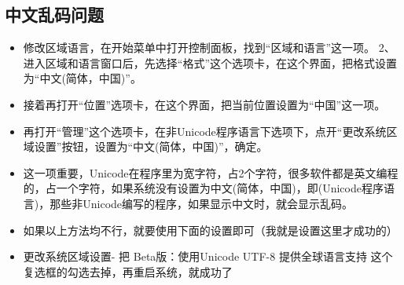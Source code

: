 \subsection{中文乱码问题}
\begin{itemize}
\item 修改区域语言，在开始菜单中打开控制面板，找到“区域和语言”这一项。
2、进入区域和语言窗口后，先选择“格式”这个选项卡，在这个界面，把格式设置为“中文(简体，中国)”。
\item 接着再打开“位置”选项卡，在这个界面，把当前位置设置为“中国”这一项。
\item 再打开“管理”这个选项卡，在非Unicode程序语言下选项下，点开“更改系统区域设置”按钮，设置为“中文(简体，中国)”，确定。
\item 这一项重要，Unicode在程序里为宽字符，占2个字符，很多软件都是英文编程的，占一个字符，如果系统没有设置为中文(简体，中国)，即(Unicode程序语言)，那些非Unicode编写的程序，如果显示中文时，就会显示乱码。
\item 如果以上方法均不行，就要使用下面的设置即可（我就是设置这里才成功的）
\item 更改系统区域设置- 把 Beta版：使用Unicode UTF-8 提供全球语言支持 这个复选框的勾选去掉，再重启系统，就成功了
\end{itemize}

